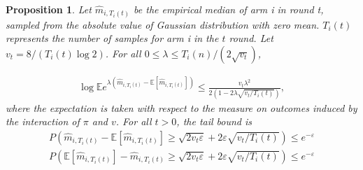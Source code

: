\documentclass{article}
\theoremstyle{plain}
\newtheorem{prop}{Proposition}
\begin{document}
\begin{prop}
Let $\hat{m}_{i, T_i(t)}$ be the empirical median of arm i in round t, sampled from the absolute value of Gaussian distribution with zero mean. $T_i(t)$ represents the number of samples for arm i in the $t$ round. Let $v_t = 8/(T_i(t) \log 2)$. For all $ 0 \leq \lambda \leq T_i(n)/(2 \sqrt{v_t})$,

\begin{align}
    \label{Boucheron propo 4.6}
    \log \mathbb{E} e^{\lambda\left(\hat{m}_{i, T_i(t)}-\mathbb{E}[ \hat{m}_{i, T_i(t)}]\right)} \leq \frac{v_t \lambda^2}{2(1-2\lambda \sqrt{v_t/T_i(t)})} ,
\end{align}
where the expectation is taken with respect to the measure on outcomes induced by the interaction of $\pi$ and $v$. For all $t > 0$, the tail bound is 
\begin{align}
    \label{Lemma 5 tail bound 1}
   P\left( \hat{m}_{i, T_i(t)}-\mathbb{E}[ \hat{m}_{i, T_i(t)}] \geq \sqrt{2v_t \varepsilon} + 2 \varepsilon \sqrt{v_t/T_i(t)} \right) \leq e^{-\varepsilon}\\
   \label{Lemma 5 tail bound 2}
   P\left( \mathbb{E}[ \hat{m}_{i, T_i(t)}] - \hat{m}_{i, T_i(t)} \geq \sqrt{2v_t \varepsilon} + 2 \varepsilon \sqrt{v_t/T_i(t)} \right) \leq e^{-\varepsilon}\\
\end{align}
\end{prop}

\printbibliography
\end{document}
